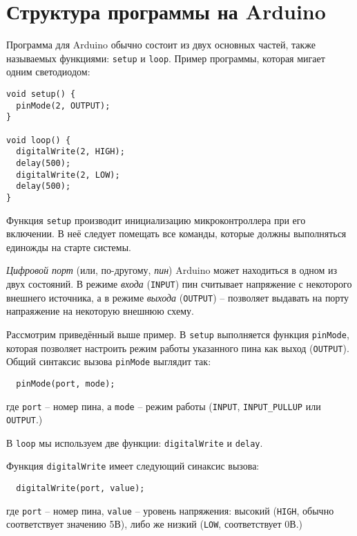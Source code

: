 \documentclass[../sparc.tex]{subfiles}
\begin{document}
\section{Структура программы на Arduino}

Программа для Arduino обычно состоит из двух основных частей, также называемых
функциями: \texttt{setup} и \texttt{loop}.  Пример программы, которая мигает
одним светодиодом:

\begin{verbatim}
void setup() {
  pinMode(2, OUTPUT);
}

void loop() {
  digitalWrite(2, HIGH);
  delay(500);
  digitalWrite(2, LOW);
  delay(500);
}
\end{verbatim}

Функция \texttt{setup} производит инициализацию микроконтроллера при его
включении. В неё следует помещать все команды, которые должны выполняться
единожды на старте системы.

\emph{Цифровой порт} (или, по-другому, \emph{пин}) Arduino может находиться в
одном из двух состояний.  В режиме \emph{входа} (\texttt{INPUT}) пин считывает
напряжение с некоторого внешнего источника, а в режиме \emph{выхода}
(\texttt{OUTPUT}) – позволяет выдавать на порту напраяжение на некоторую внешнюю
схему.

Рассмотрим приведённый выше пример. В \texttt{setup} выполняется функция
\texttt{pinMode}, которая позволяет настроить режим работы указанного пина как
выход (\texttt{OUTPUT}).  Общий синтаксис вызова \texttt{pinMode} выглядит так:

\begin{verbatim}
  pinMode(port, mode);
\end{verbatim}

где \texttt{port} -- номер пина, а \texttt{mode} -- режим работы (\texttt{INPUT},
\texttt{INPUT\_PULLUP} или \texttt{OUTPUT}.)

В \texttt{loop} мы используем две функции: \texttt{digitalWrite} и
\texttt{delay}.

Функция \texttt{digitalWrite} имеет следующий синаксис вызова:

\begin{verbatim}
  digitalWrite(port, value);
\end{verbatim}

где \texttt{port} -- номер пина, \texttt{value} -- уровень напряжения: высокий
(\texttt{HIGH}, обычно соответствует значению 5В), либо же низкий (\texttt{LOW},
соответствует 0В.)
\end{document}

